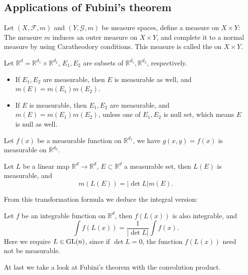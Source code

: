\subsection{Applications of Fubini's theorem}
\label{sub:Applications of Fubini's theorem}

\begin{definition}
	Let $(X, \mathscr{F}, m)$ and $(Y, \mathscr{G}, m)$ be
	measure spaces, define a measure on $X\times Y$:
	The measure $m$ induces an outer measure on  $X\times Y$,
	and complete it to a normal measure by using
	Caratheodory conditions. This measure is called
	the  on $X\times Y$.
\end{definition}

\begin{theorem}
	Let $ \mathbb{R}^d = \mathbb{R}^{d_1}\times \mathbb{R}^{d_2}$,
	$E_1,E_2$ are subsets of $\mathbb{R}^{d_1}, \mathbb{R}^{d_2}$,
	respectively.
	\begin{itemize}
		\item If $ E_1,E_2$ are measurable, then $E$ is measurable as well,
			and $m(E) = m(E_1)m(E_2)$.
		\item If $E$ is measurable, then  $E_1,E_2$ are measurable,
			and $m(E)=m(E_1)m(E_2)$, unless one of $E_1,E_2$ is null set,
			which means $E$ is null as well.
	\end{itemize}
\end{theorem}
\begin{corollary}
    Let $f(x)$ be a measurable function on  $\mathbb{R}^{d_1}$,
	we have $g(x,y)=f(x)$ is measurable on  $\mathbb{R}^{d_2}$.
\end{corollary}

\begin{proposition}
	Let $L$ be a linear map $\mathbb{R}^{d}\to \mathbb{R}^{d}$,
	$E \subset \mathbb{R}^{d}$ a measurable set, then  $L(E)$ is measurable, and
	\[
	m(L(E)) = |\det L|m(E).
	\]
\end{proposition}

From this transformation formula we deduce the integral version:

Let $f$ be an integrable function on  $\mathbb{R}^{d}$, then
$f(L(x))$ is also integrable, and
\[
\int f(L(x)) = \frac{1}{|\det L|}\int f(x).
\]
Here we require $L\in \mathrm{GL}(n)$, since if  $\det L = 0$, the function
 $f(L(x))$ need not be measurable.

 At last we take a look at Fubini's theorem with the convolution product.
